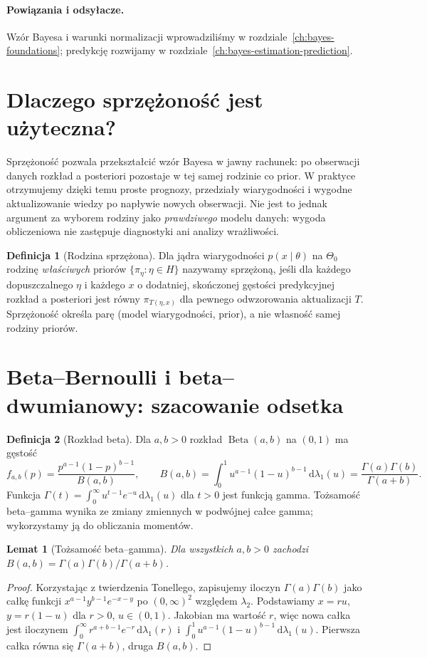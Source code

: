 \documentclass[11pt,a4paper,oneside]{report}
\numberwithin{equation}{chapter}
\theoremstyle{plain}
\newtheorem{lemat}[twierdzenie]{Lemat}
\theoremstyle{definition}
\newtheorem{definicja}{Definicja}[chapter]
\theoremstyle{remark}
\newcommand{\dd}{\mathrm d}
\begin{document}
\paragraph{Powiązania i odsyłacze.} Wzór Bayesa i warunki normalizacji wprowadziliśmy w rozdziale~\ref{ch:bayes-foundations}; predykcję rozwijamy w rozdziale~\ref{ch:bayes-estimation-prediction}.


\section{Dlaczego sprzężoność jest użyteczna?}
Sprzężoność pozwala przekształcić wzór Bayesa w jawny rachunek:
po obserwacji danych rozkład a posteriori pozostaje w tej samej
rodzinie co prior. W praktyce otrzymujemy dzięki temu proste
prognozy, przedziały wiarygodności i wygodne aktualizowanie wiedzy
po napływie nowych obserwacji. Nie jest to jednak argument za
wyborem rodziny jako \emph{prawdziwego} modelu danych:
wygoda obliczeniowa nie zastępuje diagnostyki ani analizy wrażliwości.

\begin{definicja}[Rodzina sprzężona]
Dla jądra wiarygodności $p(x\mid\theta)$ na
$\Theta_0$ rodzinę \emph{właściwych} priorów
$\{\pi_\eta:\eta\in H\}$ nazywamy sprzężoną, jeśli dla
każdego dopuszczalnego $\eta$ i każdego $x$ o dodatniej,
skończonej gęstości predykcyjnej rozkład a posteriori jest
równy $\pi_{T(\eta,x)}$ dla pewnego odwzorowania aktualizacji
$T$. Sprzężoność określa parę (model wiarygodności, prior),
a nie własność samej rodziny priorów.
\end{definicja}

\section{Beta--Bernoulli i beta--dwumianowy: szacowanie odsetka}
\begin{definicja}[Rozkład beta]
Dla $a,b>0$ rozkład $\operatorname{Beta}(a,b)$ na $(0,1)$
ma gęstość
\[
 f_{a,b}(p)=\frac{p^{a-1}(1-p)^{b-1}}{B(a,b)},
 \qquad B(a,b)=\int_0^1u^{a-1}(1-u)^{b-1}\,\dd\lambda_1(u)
 =\frac{\Gamma(a)\Gamma(b)}{\Gamma(a+b)}.
\]
Funkcja $\Gamma(t)=\int_0^\infty u^{t-1}e^{-u}\,\dd\lambda_1(u)$
dla $t>0$ jest funkcją gamma. Tożsamość beta--gamma wynika
ze zmiany zmiennych w podwójnej całce gamma; wykorzystamy
ją do obliczania momentów.
\end{definicja}

\begin{lemat}[Tożsamość beta--gamma]
Dla wszystkich $a,b>0$ zachodzi
$B(a,b)=\Gamma(a)\Gamma(b)/\Gamma(a+b)$.
\end{lemat}
\begin{proof}
Korzystając z twierdzenia Tonellego, zapisujemy iloczyn
$\Gamma(a)\Gamma(b)$ jako całkę funkcji
$x^{a-1}y^{b-1}e^{-x-y}$ po $(0,\infty)^2$
względem $\lambda_2$. Podstawiamy $x=ru$, $y=r(1-u)$
dla $r>0$, $u\in(0,1)$. Jakobian ma wartość $r$,
więc nowa całka jest iloczynem
$\int_0^\infty r^{a+b-1}e^{-r}\,\dd\lambda_1(r)$
i $\int_0^1u^{a-1}(1-u)^{b-1}\,\dd\lambda_1(u)$.
Pierwsza całka równa się $\Gamma(a+b)$, druga $B(a,b)$.
\end{proof}
\end{document}
